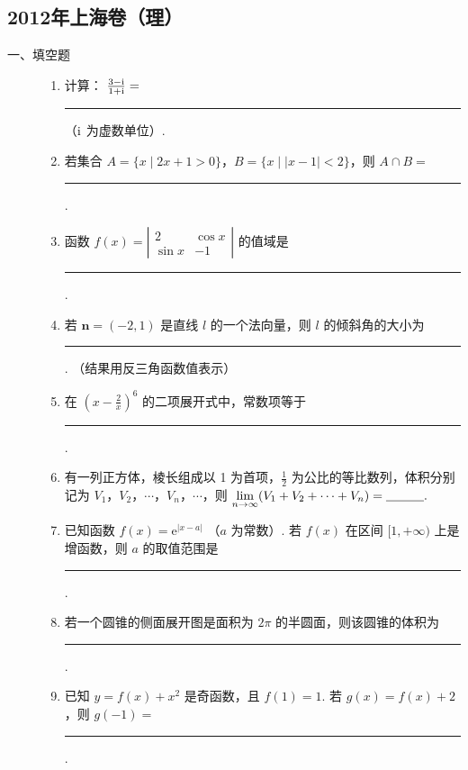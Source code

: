 \subsection{2012年上海卷（理）}\label{gk:2012年上海卷（理）}

\begin{description}

    \item[一、填空题]

    \begin{enumerate}[leftmargin=5pt]

        \item 计算： \( \frac{3-\mathrm{i}}{1+\mathrm{i}}= \)\rule[-0.3ex]{3em}{0.4pt}（\(\mathrm{i}\) 为虚数单位）.

        \item 若集合 \(A = \{x \mid 2x + 1 > 0\}\)，\(B = \{x \mid |x - 1| < 2\}\)，则 \(A \cap B = \)\rule[-0.3ex]{3em}{0.4pt}.

        \item 函数 \( f(x) = \left| \begin{matrix} 2 & \cos x \\ \sin x & -1 \end{matrix} \right| \) 的值域是\rule[-0.3ex]{3em}{0.4pt}.

        \item 若 \(\bm{n} = (-2,1)\) 是直线 \(l\) 的一个法向量，则 \(l\) 的倾斜角的大小为\rule[-0.3ex]{3em}{0.4pt}. （结果用反三角函数值表示）

        \item 在 \(\left(x - \frac{2}{x}\right)^6\) 的二项展开式中，常数项等于\rule[-0.3ex]{3em}{0.4pt}.

        \item 有一列正方体，棱长组成以 1 为首项，\(\frac{1}{2}\) 为公比的等比数列，体积分别记为 \(V_{1}\)，\(V_{2}\)，\(\cdots\)，\(V_{n}\)，\(\cdots\)，则 \(\displaystyle\lim_{n \to \infty} (V_{1} + V_{2} + \cdots + V_{n}) =\rule[-0.3ex]{3em}{0.4pt}.\)

        \item 已知函数 \( f(x) = {\mathrm{e}}^{|x - a|} \) （\( a \) 为常数）. 若 \( f(x) \) 在区间 \([1, +\infty)\) 上是增函数，则 \( a \) 的取值范围是\rule[-0.3ex]{3em}{0.4pt}.

        \item 若一个圆锥的侧面展开图是面积为 \(2\pi\) 的半圆面，则该圆锥的体积为\rule[-0.3ex]{3em}{0.4pt}.

        \item 已知 \( y = f(x) + x^2 \) 是奇函数，且 \( f(1) = 1 \). 若 \( g(x) = f(x) + 2 \)，则 \( g(-1) = \)\rule[-0.3ex]{3em}{0.4pt}.


\end{enumerate}
\end{description}
